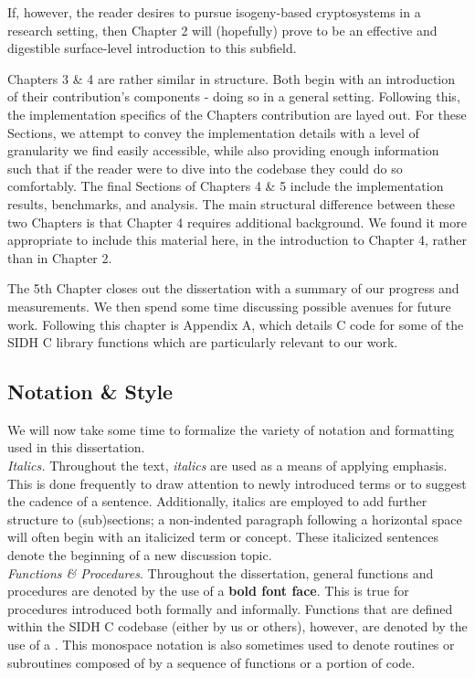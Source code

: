 If, however, the reader desires to pursue isogeny-based cryptosystems in a research setting, then Chapter 2 will (hopefully) prove to be an effective and digestible surface-level introduction to this subfield.  

Chapters 3 \& 4 are rather similar in structure. Both begin with an introduction of their contribution's components - doing so in a general setting. Following this, the implementation specifics of the Chapters contribution are layed out. For these Sections, we attempt to convey the implementation details with a level of granularity we find easily accessible, while also providing enough information such that if the reader were to dive into the codebase they could do so comfortably. The final Sections of Chapters 4 \& 5 include the implementation results, benchmarks, and analysis. The main structural difference between these two Chapters is that Chapter 4 requires additional background. We found it more appropriate to include this material here, in the introduction to Chapter 4, rather than in Chapter 2.

The 5th Chapter closes out the dissertation with a summary of our progress and measurements. We then spend some time discussing possible avenues for future work. Following this chapter is Appendix A, which details C code for some of the SIDH C library functions which are particularly relevant to our work.

\subsection{Notation \& Style}

We will now take some time to formalize the variety of notation and formatting used in this dissertation.\\

\noindent
\textit{Italics.} Throughout the text, \textit{italics} are used as a means of applying emphasis. This is done frequently to draw attention to newly introduced terms or to suggest the cadence of a sentence. Additionally, italics are employed to add further structure to (sub)sections; a non-indented paragraph following a horizontal space will often begin with an italicized term or concept. These italicized sentences denote the beginning of a new discussion topic.\\

\noindent
\textit{Functions \& Procedures}. Throughout the dissertation, general functions and procedures are denoted by the use of a \textbf{bold font face}. This is true for procedures introduced both formally and informally. Functions that are defined within the SIDH C codebase (either by us or others), however, are denoted by the use of a . This monospace notation is also sometimes used to denote routines or subroutines composed of by a sequence of functions or a portion of code. 

